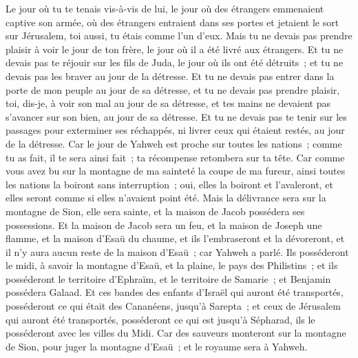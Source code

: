 \begin{multicols}{2}
Le jour où tu te tenais vis-à-vis de lui, le jour où des étrangers emmenaient captive son armée, où des étrangers entraient dans ses portes et jetaient le sort sur Jérusalem, toi aussi, tu étais comme l'un d'eux.
Mais tu ne devais pas prendre plaisir à voir le jour de ton frère, le jour où il a été livré aux étrangers. Et tu ne devais pas te réjouir sur les fils de Juda, le jour où ils ont été détruits~; et tu ne devais pas les braver au jour de la détresse.
Et tu ne devais pas entrer dans la porte de mon peuple au jour de sa détresse, et tu ne devais pas prendre plaisir, toi, dis-je, à voir son mal au jour de sa détresse, et tes mains ne devaient pas s'avancer sur son bien, au jour de sa détresse.
Et tu ne devais pas te tenir sur les passages pour exterminer ses réchappés, ni livrer ceux qui étaient restés, au jour de la détresse.
Car le jour de Yahweh est proche sur toutes les nations~; comme tu as fait, il te sera ainsi fait~; ta récompense retombera sur ta tête.
Car comme vous avez bu sur la montagne de ma sainteté la coupe de ma fureur, ainsi toutes les nations la boiront sans interruption~; oui, elles la boiront et l'avaleront, et elles seront comme si elles n'avaient point été.
Mais la délivrance sera sur la montagne de Sion, elle sera sainte, et la maison de Jacob possédera ses possessions.
Et la maison de Jacob sera un feu, et la maison de Joseph une flamme, et la maison d'Esaü du chaume, et ils l'embraseront et la dévoreront, et il n'y aura aucun reste de la maison d'Esaü~; car Yahweh a parlé.
Ils posséderont le midi, à savoir la montagne d'Esaü, et la plaine, le pays des Philistins~; et ils posséderont le territoire d'Ephraïm, et le territoire de Samarie~; et Benjamin possédera Galaad.
Et ces bandes des enfants d'Israël qui auront été transportés, posséderont ce qui était des Cananéens, jusqu'à Sarepta~; et ceux de Jérusalem qui auront été transportés, posséderont ce qui est jusqu'à Sépharad, ils le posséderont avec les villes du Midi.
Car des sauveurs monteront sur la montagne de Sion, pour juger la montagne d'Esaü~; et le royaume sera à Yahweh.
\PPE{}
\end{multicols}
